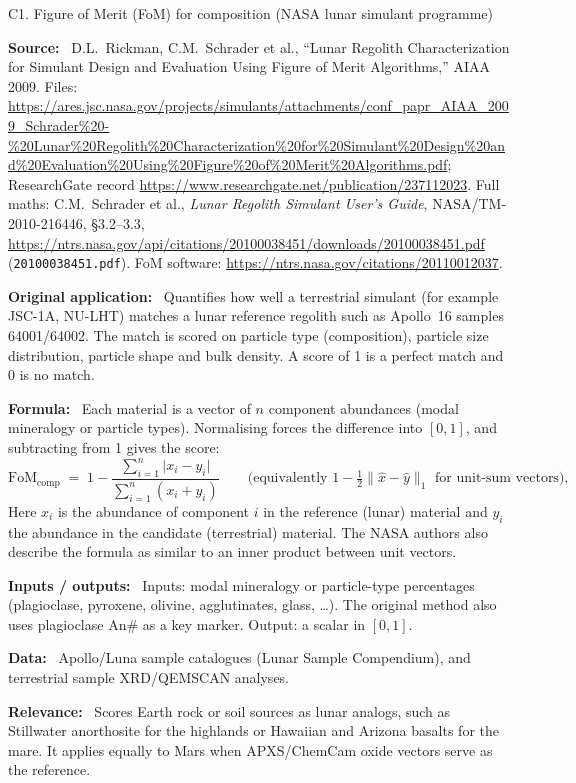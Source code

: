 \documentclass[11pt,a4paper]{article}
\newcommand{\field}[1]{\par\smallskip\textbf{\color{navy}#1:}\ }
\begin{document}
\begin{method}{C1. Figure of Merit (FoM) for composition (NASA lunar simulant programme)}
\field{Source} D.L.~Rickman, C.M.~Schrader et al., ``Lunar Regolith Characterization for Simulant Design and Evaluation Using Figure of Merit Algorithms,'' AIAA 2009. Files: \url{https://ares.jsc.nasa.gov/projects/simulants/attachments/conf_papr_AIAA_2009_Schrader\%20-\%20Lunar\%20Regolith\%20Characterization\%20for\%20Simulant\%20Design\%20and\%20Evaluation\%20Using\%20Figure\%20of\%20Merit\%20Algorithms.pdf}; ResearchGate record \url{https://www.researchgate.net/publication/237112023}. Full maths: C.M.~Schrader et al., \emph{Lunar Regolith Simulant User's Guide}, NASA/TM-2010-216446, \S3.2--3.3, \url{https://ntrs.nasa.gov/api/citations/20100038451/downloads/20100038451.pdf} (\texttt{20100038451.pdf}). FoM software: \url{https://ntrs.nasa.gov/citations/20110012037}.
\field{Original application} Quantifies how well a terrestrial simulant (for example JSC-1A, NU-LHT) matches a lunar reference regolith such as Apollo~16 samples 64001/64002. The match is scored on particle type (composition), particle size distribution, particle shape and bulk density. A score of 1 is a perfect match and 0 is no match.
\field{Formula} Each material is a vector of $n$ component abundances (modal mineralogy or particle types). Normalising forces the difference into $[0,1]$, and subtracting from 1 gives the score:
\begin{equation}
  \mathrm{FoM}_{\text{comp}} \;=\; 1 - \frac{\sum_{i=1}^{n} \lvert x_i - y_i\rvert}{\sum_{i=1}^{n} (x_i + y_i)}
  \qquad\text{(equivalently } 1-\tfrac12\lVert \hat{x}-\hat{y}\rVert_1 \text{ for unit-sum vectors)} ,
\end{equation}
Here $x_i$ is the abundance of component $i$ in the reference (lunar) material and $y_i$ the abundance in the candidate (terrestrial) material. The NASA authors also describe the formula as similar to an inner product between unit vectors.
\field{Inputs / outputs} Inputs: modal mineralogy or particle-type percentages (plagioclase, pyroxene, olivine, agglutinates, glass, \dots). The original method also uses plagioclase An\# as a key marker. Output: a scalar in $[0,1]$.
\field{Data} Apollo/Luna sample catalogues (Lunar Sample Compendium), and terrestrial sample XRD/QEMSCAN analyses.
\field{Relevance} Scores Earth rock or soil sources as lunar analogs, such as Stillwater anorthosite for the highlands or Hawaiian and Arizona basalts for the mare. It applies equally to Mars when APXS/ChemCam oxide vectors serve as the reference.

\end{method}
\end{document}
